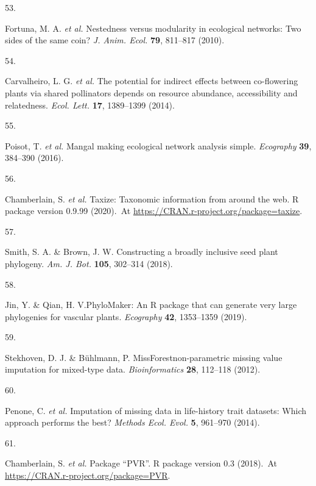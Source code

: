 \documentclass[
  12pt,
  a4paper,
]{article}
\newlength{\cslhangindent}
\newlength{\csllabelwidth}
\newlength{\cslentryspacingunit} %
\newenvironment{CSLReferences}[2] %
 {%
  \setlength{\parindent}{0pt}
  \ifodd #1
  \let\oldpar\par
  \def\par{\hangindent=\cslhangindent\oldpar}
  \fi
  \setlength{\parskip}{#2\cslentryspacingunit}
 }%
 {}
\newcommand{\CSLLeftMargin}[1]{\parbox[t]{\csllabelwidth}{#1}}
\newcommand{\CSLRightInline}[1]{\parbox[t]{\linewidth - \csllabelwidth}{#1}\break}
\begin{document}
\begin{CSLReferences}{0}{0}
\leavevmode{}%
\CSLLeftMargin{53. }
\CSLRightInline{Fortuna, M. A. \emph{et al.} Nestedness versus modularity in ecological networks: Two sides of the same coin? \emph{J. Anim. Ecol.} \textbf{79}, 811--817 (2010).}

\leavevmode{}%
\CSLLeftMargin{54. }
\CSLRightInline{Carvalheiro, L. G. \emph{et al.} The potential for indirect effects between co-flowering plants via shared pollinators depends on resource abundance, accessibility and relatedness. \emph{Ecol. Lett.} \textbf{17}, 1389--1399 (2014).}

\leavevmode{}%
\CSLLeftMargin{55. }
\CSLRightInline{Poisot, T. \emph{et al.} Mangal \textendash{} making ecological network analysis simple. \emph{Ecography} \textbf{39}, 384--390 (2016).}

\leavevmode{}%
\CSLLeftMargin{56. }
\CSLRightInline{Chamberlain, S. \emph{et al.} Taxize: {Taxonomic} information from around the web. R package version 0.9.99 (2020).~At \href{https://CRAN.R-project.org/package=taxize}{https://CRAN.r-project.org/package=taxize}.}

\leavevmode{}%
\CSLLeftMargin{57. }
\CSLRightInline{Smith, S. A. \& Brown, J. W. Constructing a broadly inclusive seed plant phylogeny. \emph{Am. J. Bot.} \textbf{105}, 302--314 (2018).}

\leavevmode{}%
\CSLLeftMargin{58. }
\CSLRightInline{Jin, Y. \& Qian, H. V.{PhyloMaker}: An {R} package that can generate very large phylogenies for vascular plants. \emph{Ecography} \textbf{42}, 1353--1359 (2019).}

\leavevmode{}%
\CSLLeftMargin{59. }
\CSLRightInline{Stekhoven, D. J. \& Bühlmann, P. {MissForest}\textemdash non-parametric missing value imputation for mixed-type data. \emph{Bioinformatics} \textbf{28}, 112--118 (2012).}

\leavevmode{}%
\CSLLeftMargin{60. }
\CSLRightInline{Penone, C. \emph{et al.} Imputation of missing data in life-history trait datasets: Which approach performs the best? \emph{Methods Ecol. Evol.} \textbf{5}, 961--970 (2014).}

\leavevmode{}%
\CSLLeftMargin{61. }
\CSLRightInline{Chamberlain, S. \emph{et al.} Package {``{PVR}''}. R package version 0.3 (2018).~At \href{https://CRAN.R-project.org/package=PVR}{https://CRAN.r-project.org/package=PVR}.}


\end{CSLReferences}
\end{document}
